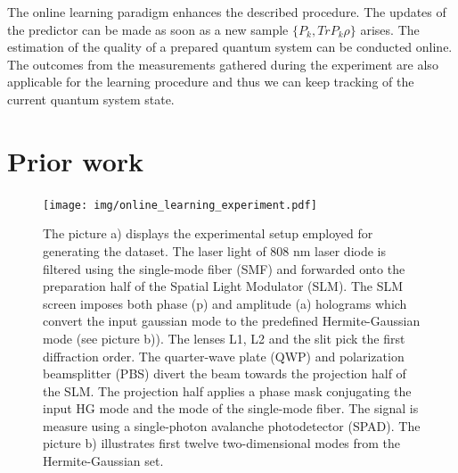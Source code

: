 \documentclass[%
 reprint,
 amsmath,amssymb,
 aps,
]{revtex4-2}
\begin{document}
The online learning paradigm \cite{Aaronson_2019} enhances the described procedure. The updates of the predictor can be made as soon as a new sample $\{P_{k}, Tr{P_{k}\rho}\}$ arises. The estimation of the quality of a prepared quantum system can be conducted online. The outcomes from the measurements gathered during the experiment are also applicable for the learning procedure and thus we can keep tracking of the current quantum system state. 

\section{Prior work}


\begin{figure}[ht!]
    \centering
    \texttt{[image: img/online\_learning\_experiment.pdf]}
    \caption{The picture a) displays the experimental setup employed for generating the dataset. The laser light of 808 nm laser diode is filtered using the single-mode fiber (SMF) and forwarded onto the preparation half of the Spatial Light Modulator (SLM). The SLM screen imposes both phase (p) and amplitude (a) holograms which convert the input gaussian mode to the predefined Hermite-Gaussian mode (see picture b)). The lenses L1, L2 and the slit pick the first diffraction order. The quarter-wave plate (QWP) and polarization beamsplitter (PBS) divert the beam towards the projection half of the SLM. The projection half applies a phase mask conjugating the input HG mode and the mode of the single-mode fiber. The signal is measure using a single-photon avalanche photodetector (SPAD). The picture b) illustrates first twelve two-dimensional modes from the Hermite-Gaussian set.}
    \label{fig:experiment}
\end{figure}
\end{document}
